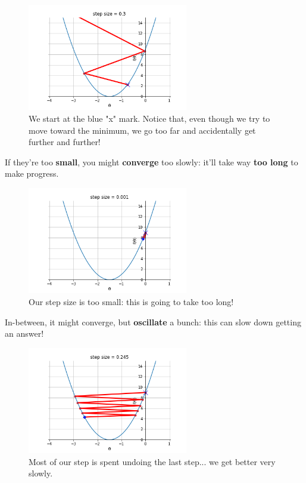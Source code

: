         \begin{figure}[H]
        \centering
            \includegraphics[width=70mm,scale=0.5]{images/gradient_descent_images/diverge.png}
        
        \caption*{We start at the blue "x" mark. Notice that, even though we try to move toward the minimum, we go too far and accidentally get further and further!}
        \end{figure}
        
        If they're too \textbf{small}, you might \textbf{converge} too slowly: it'll take way \textbf{too long} to make progress.
        
        \begin{figure}[H]
        \centering
            \includegraphics[width=70mm,scale=0.5]{images/gradient_descent_images/converge_slowly.png}
        
        \caption*{Our step size is too small: this is going to take too long!}
        \end{figure}
        
        In-between, it might converge, but \textbf{oscillate} a bunch: this can slow down getting an answer!
        
        \begin{figure}[H]
        \centering
            \includegraphics[width=70mm,scale=0.5]{images/gradient_descent_images/oscillate.png}
        
        \caption*{Most of our step is spent undoing the last step... we get better very slowly.}
        \end{figure}
        
